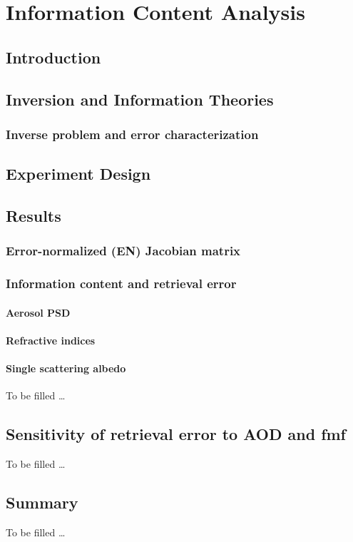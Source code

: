 \chapter{Information Content Analysis}

\section{Introduction}

\section{Inversion and Information Theories}

\subsection{Inverse problem and error characterization}

\section{Experiment Design}

\section{Results}

\subsection{Error-normalized (EN) Jacobian matrix}

\subsection{Information content and retrieval error}

\subsubsection{Aerosol PSD}

\subsubsection{Refractive indices}

\subsubsection{Single scattering albedo}

 To be filled \ldots

\section{Sensitivity of retrieval error to AOD and fmf}

 To be filled \ldots

\section{Summary}

 To be filled \ldots
